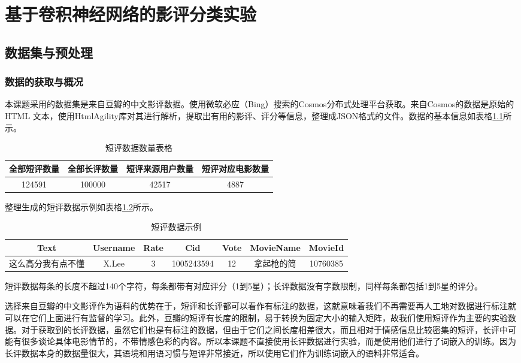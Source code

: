\chapter{基于卷积神经网络的影评分类实验}
\section{数据集与预处理}
\subsection{数据的获取与概况}
本课题采用的数据集是来自豆瓣的中文影评数据。使用微软必应（Bing）搜索的Cosmos分布式处理平台获取。来自Cosmos的数据是原始的HTML 文本，使用HtmlAgility库对其进行解析，提取出有用的影评、评分等信息，整理成JSON格式的文件。数据的基本信息如表格\ref{tab:comment count}所示。

\begin{table}
\centering
\caption{短评数据数量表格} \label{tab:comment count}
\begin{tabular}{c|c|c|c}
    \hline
    全部短评数量 & 全部长评数量 & 短评来源用户数量 & 短评对应电影数量\\
    \hline
    124591 & 100000 & 42517 & 4887\\
    \hline
\end{tabular}
\end{table}

整理生成的短评数据示例如表格\ref{tab:comment format}所示。
\begin{table}
\centering
\caption{短评数据示例} \label{tab:comment format}
\begin{tabular}{c|c|c|c|c|c|c}
    \hline
    Text & Username & Rate & Cid & Vote & MovieName & MovieId\\
    \hline
    这么高分我有点不懂 & X.Lee & 3 & 1005243594 & 12 & 拿起枪的简 & 10760385\\
    \hline
\end{tabular}
\end{table}

短评数据每条的长度不超过140个字符，每条都带有对应评分（1到5星）；长评数据没有字数限制，同样每条都包括1到5星的评分。

选择来自豆瓣的中文影评作为语料的优势在于，短评和长评都可以看作有标注的数据，这就意味着我们不再需要再人工地对数据进行标注就可以在它们上面进行有监督的学习。此外，豆瓣的短评有长度的限制，易于转换为固定大小的输入矩阵，故我们使用短评作为主要的实验数据。对于获取到的长评数据，虽然它们也是有标注的数据，但由于它们之间长度相差很大，而且相对于情感信息比较密集的短评，长评中可能有很多谈论具体电影情节的，不带情感色彩的内容。所以本课题不直接使用长评数据进行实验，而是使用他们进行了词嵌入的训练。因为长评数据本身的数据量很大，其语境和用语习惯与短评非常接近，所以使用它们作为训练词嵌入的语料非常适合。

